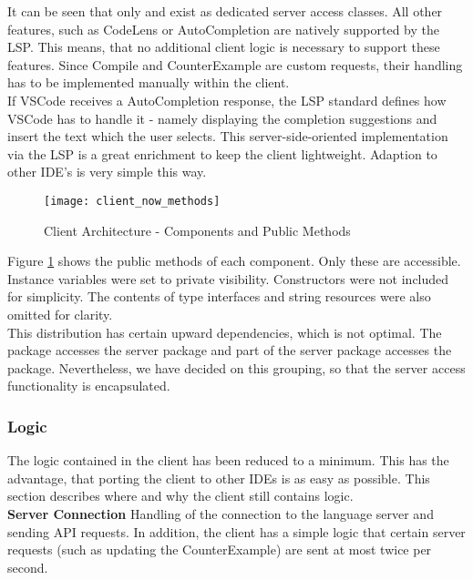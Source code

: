 It can be seen that only  and  exist as dedicated server access classes.
All other features, such as CodeLens or AutoCompletion are natively supported by the LSP.
This means, that no additional client logic is necessary to support these features.
Since Compile and CounterExample are custom requests,
their handling has to be implemented manually within the client.\\

If VSCode receives a AutoCompletion response, the LSP standard defines how VSCode has to handle it -
namely displaying the completion suggestions and insert the text which the user selects.
This server-side-oriented implementation via the LSP is a great enrichment to keep the client lightweight.
Adaption to other IDE's is very simple this way.

\begin{figure}[H]
    \centering
    \texttt{[image: client\_now\_methods]}
    \caption{Client Architecture - Components and Public Methods}
    \label{fig:client_now_methods}
\end{figure}

Figure \ref{fig:client_now_methods} shows the public methods of each component.
Only these are accessible.
Instance variables were set to private visibility.
Constructors were not included for simplicity.
The contents of type interfaces and string resources were also omitted for clarity.\\

This distribution has certain upward dependencies, which is not optimal.
The  package accesses the server package and part of the server package accesses the  package.
Nevertheless, we have decided on this grouping,
so that the server access functionality is encapsulated.

\subsubsection{Logic}
The logic contained in the client has been reduced to a minimum.
This has the advantage, that porting the client to other IDEs is as easy as possible.
This section describes where and why the client still contains logic.\\

{\bf Server Connection} \textendash{}
Handling of the connection to the language server and sending API requests.
In addition, the client has a simple logic that certain server requests (such as updating the CounterExample)
are sent at most twice per second. \\

